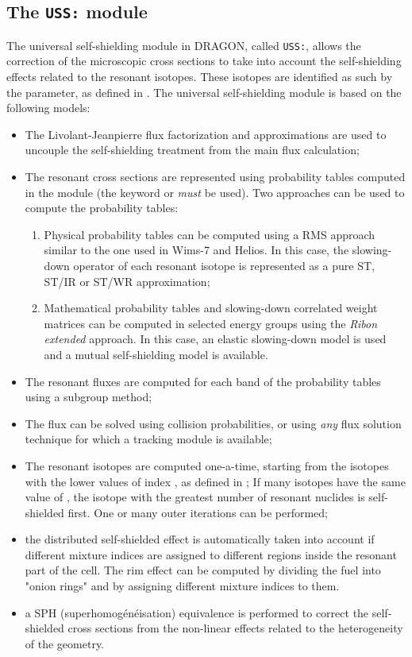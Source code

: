 \subsection{The {\tt USS:} module}\label{sect:USSData}

The universal self-shielding module in DRAGON, called {\tt USS:}, allows the
correction of the microscopic cross sections to take into account the
self-shielding effects related to the resonant isotopes. These isotopes are
identified as such by the 
parameter, as defined in . The universal
self-shielding module is based on the following models:

\begin{itemize}
\item The Livolant-Jeanpierre flux factorization and approximations are used to
uncouple the self-shielding treatment from the main flux calculation;
\item The resonant cross sections are represented using probability
tables computed in the  module (the keyword  or  {\sl must} be
used). Two approaches can be used to compute the probability tables:
\begin{enumerate}
\item Physical probability tables can be computed using a RMS approach similar
to the one used in Wims-7 and Helios.\cite{subg} In this case, the slowing-down operator of
each resonant isotope is represented as a pure ST\cite{st}, ST/IR or ST/WR approximation;
\item Mathematical probability tables\cite{pt} and slowing-down correlated weight matrices
can be computed in selected energy groups using the {\sl Ribon extended} approach.\cite{nse2004} In this case,
an elastic slowing-down model is used and a mutual self-shielding model is
available.
\end{enumerate}
\item The resonant fluxes are computed for each band of the probability tables
using a subgroup method;
\item The flux can be solved using collision probabilities, or using {\sl any}
flux solution technique for which a tracking module is available;
\item The resonant isotopes are computed one-a-time, starting from the isotopes
with the lower values of index , as defined in ; If
many isotopes have the same value of , the isotope with the greatest
number of resonant nuclides is self-shielded first. One or many outer iterations
can be performed;
\item the distributed self-shielded effect is automatically taken into account
if different mixture indices are assigned to different regions inside the
resonant part of the cell. The rim effect can be computed by dividing the fuel
into "onion rings" and by assigning different mixture indices to them. 
\item a SPH (superhomog\'en\'eisation) equivalence is performed to correct the
self-shielded cross sections from the non-linear effects related to the
heterogeneity of the geometry.
\end{itemize}

